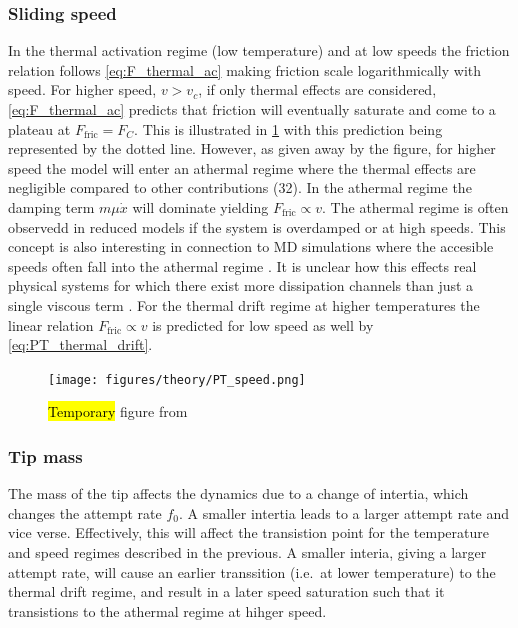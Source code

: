 


\subsubsection{Sliding speed}
In the thermal activation regime (low temperature) and at low speeds the friction relation follows \cref{eq:F_thermal_ac} making friction scale logarithmically with speed. For higher speed, $v > v_c$, if only thermal effects are considered, \cref{eq:F_thermal_ac} predicts that friction will eventually saturate and come to a plateau at $F_{\text{fric}} = F_C$. This is illustrated in \cref{fig:PT_speed} with this prediction being represented by the dotted line. However, as given away by the figure, for higher speed the model will enter an athermal regime where the thermal effects are negligible compared to other contributions \cite{Yalin_2011}(32). In the athermal regime the damping term $m\mu \dot{x}$ will dominate yielding $F_{\text{fric}}
\propto v$. The athermal regime is often observedd in reduced models if the system is overdamped or at high speeds. This concept is also interesting in connection to \acrshort{MD} simulations where the accesible speeds often fall into the athermal regime \cite{Li_2011}. It is unclear how this effects real physical systems for which there exist more dissipation channels than just a single viscous term \cite{Dong_2013}. For the thermal drift regime at higher temperatures the linear relation $F_{\text{fric}} \propto v$ is predicted for low speed as well by \cref{eq:PT_thermal_drift}.

\begin{figure}[H]
  \centering
  \texttt{[image: figures/theory/PT\_speed.png]}
  \caption{\hl{Temporary} figure from \cite{Yalin_2011}}
  \label{fig:PT_speed}
\end{figure}


\subsubsection{Tip mass}
The mass of the tip affects the dynamics due to a change of intertia, which changes the attempt rate $f_0$. A smaller intertia leads to a larger attempt rate and vice verse. Effectively, this will affect the transistion point for the temperature and speed regimes described in the previous. A smaller interia, giving a larger attempt rate, will cause an earlier transsition (i.e.\ at lower temperature) to the thermal drift regime, and result in a later speed saturation such that it transistions to the athermal regime at hihger speed. 



